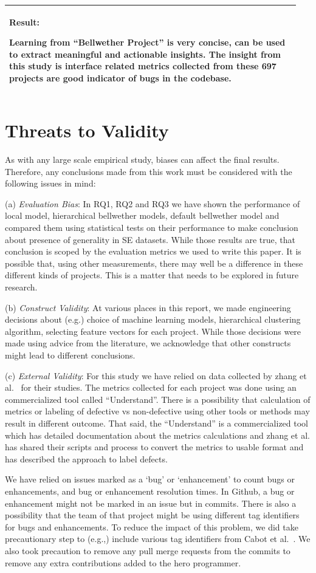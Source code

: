 \documentclass[10pt,journal,compsoc]{IEEEtran}
\newenvironment{result}
{\vspace{0.15cm}
\noindent\begin{minipage}{\linewidth}
\begin{center}
\arrayrulecolor{lightergray}
\begin{tabular}{|p{0.95\linewidth}|}
\hline%
\rowcolor{lightergray}%
\textbf{Result:}~%
}
{\\\hline
\end{tabular}
\end{center}
\end{minipage}
\vspace{0.15cm}
}
\begin{document}
\begin{result}
{Learning from ``Bellwether Project'' is very concise, can be used to extract meaningful and actionable insights. The insight from this study is interface related metrics collected from these 697 projects are good indicator of bugs in the codebase. }
\end{result}


\section{Threats to Validity}
\label{sec:validity}

As with any large scale empirical study, biases can affect the final
results. Therefore, any conclusions made from this work
must be considered with the following issues in mind:

(a) \textit{Evaluation Bias}: 
In  RQ1, RQ2 and RQ3 we have shown the performance of local model, hierarchical bellwether models, default bellwether model and compared them using statistical tests on their performance to make conclusion about presence of generality in SE datasets. While those results are true, that conclusion is scoped by the evaluation metrics we used to write this paper. It is possible that, using other measurements, there may well be a difference in these different kinds of projects. This is a matter that needs to be explored in future research.  

    
(b) \textit{Construct Validity}: At various places in this report, we made engineering decisions about (e.g.) choice of machine learning models, hierarchical clustering algorithm, selecting feature vectors for each project. While those decisions were made using advice from the literature, we acknowledge that other constructs might lead to different conclusions. 

(c) \textit{External Validity}: For this study we have relied on data collected by zhang et al.~\cite{zhang15} for their studies. The metrics collected for each project was done using an commercialized tool called ``Understand''. There is a possibility that calculation of metrics or labeling of defective vs non-defective using other tools or methods may result in different outcome. That said, the ``Understand'' is a commercialized tool which has detailed documentation about the metrics calculations and zhang et al. has shared their scripts and process to convert the metrics to usable format and has described the approach to label defects.  

We have relied on issues marked as a `bug' or `enhancement' to count bugs or enhancements, and bug or enhancement resolution times. In Github, a bug or enhancement might not be marked in an issue but in commits. There is also a possibility that the team of that project might be using different tag identifiers for bugs and enhancements. To reduce the impact of this problem, we  did take precautionary step to (e.g.,) include various tag identifiers from Cabot et al.~\cite{cabot2015exploring}. We also took precaution to remove any pull merge requests from the commits to remove any extra contributions added to the hero programmer. 
\end{document}
